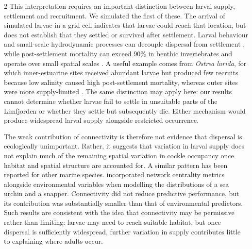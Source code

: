 \begin{spacing}{2}
This interpretation requires an important distinction between larval supply, settlement and recruitment. We simulated the first of these. The arrival of simulated larvae in a grid cell indicates that larvae could reach that location, but does not establish that they settled or survived after settlement. Larval behaviour and small-scale hydrodynamic processes can decouple dispersal from settlement \citep{pinedaCausesDecouplingLarval2010}, while post-settlement mortality can exceed 90\% in benthic invertebrates and operate over small spatial scales \citep{gosselinJuvenileMortalityBenthic1997, huntRoleEarlyPostsettlement1997}. A useful example comes from \textit{Ostrea lurida}, for which inner-estuarine sites received abundant larvae but produced few recruits because low salinity caused high post-settlement mortality, whereas outer sites were more supply-limited \citep{pritchardVariationLarvalSupply2016}. The same distinction may apply here: our results cannot determine whether larvae fail to settle in unsuitable parts of the Limfjorden or whether they settle but subsequently die.  Either mechanism would produce widespread larval supply alongside restricted occurrence.

The weak contribution of connectivity is therefore not evidence that dispersal is ecologically unimportant. Rather, it suggests that variation in larval supply does not explain much of the remaining spatial variation in cockle occupancy once habitat and spatial structure are accounted for. A similar pattern has been reported for other marine species. \citet{cecinoTestingInfluenceSeascape2021} incorporated network centrality metrics alongside environmental variables when modelling the distributions of a sea urchin and a snapper. Connectivity did not reduce predictive performance, but its contribution was substantially smaller than that of environmental predictors. Such results are consistent with the idea that connectivity may be permissive rather than limiting: larvae may need to reach suitable habitat, but once dispersal is sufficiently widespread, further variation in supply contributes little to explaining where adults occur.


\end{spacing}
